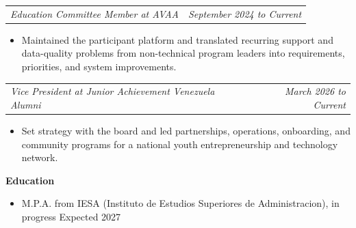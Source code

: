 \documentclass[10pt,letterpaper]{article}
\makeatletter
\newcommand{\bodyfont}{\fontsize{10.5}{15.75}\selectfont}
\newcommand{\sectiontitle}[1]{%
  \vspace{4pt}
  {\bodyfont\textbf{#1}}\par
  \nopagebreak[4]
  \vspace{2pt}
}
\newcommand{\roleline}[2]{%
  \begin{tabularx}{\textwidth}{@{}Xr@{}}
    \bodyfont\textit{#1} & \bodyfont\textit{#2}
  \end{tabularx}
  \nopagebreak[4]
  \vspace{1pt}
}
\makeatother
\begin{document}
\vspace{3pt}
\roleline{Education Committee Member at AVAA}{September 2024 to Current}
\begin{itemize}
  \item Maintained the participant platform and translated recurring support and data-quality problems from non-technical program leaders into requirements, priorities, and system improvements.
\end{itemize}

\vspace{3pt}
\roleline{Vice President at Junior Achievement Venezuela Alumni}{March 2026 to Current}
\begin{itemize}
  \item Set strategy with the board and led partnerships, operations, onboarding, and community programs for a national youth entrepreneurship and technology network.
\end{itemize}

\sectiontitle{Education}
\begin{itemize}
  \item M.P.A. from IESA (Instituto de Estudios Superiores de Administracion), in progress \hfill Expected 2027
\end{itemize}
\end{document}
